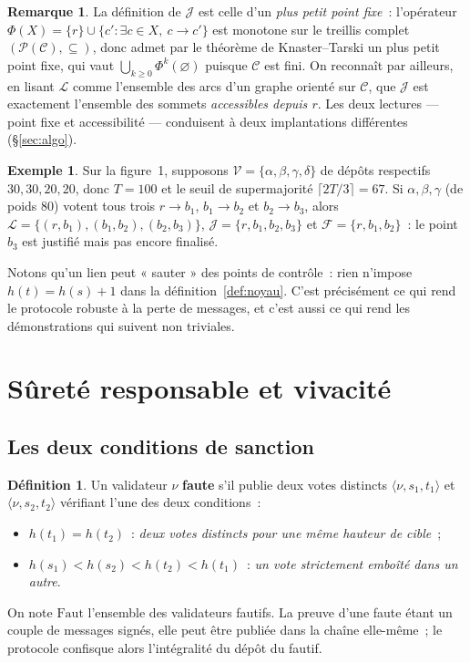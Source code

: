 \documentclass[11pt,a4paper]{article}
\theoremstyle{plain}
\theoremstyle{definition}
\newtheorem{defi}[theoreme]{Définition}
\newtheorem{remarque}[theoreme]{Remarque}
\newtheorem{exemple}[theoreme]{Exemple}
\newcommand{\Cc}{\mathcal{C}}
\newcommand{\Vv}{\mathcal{V}}
\newcommand{\Ll}{\mathcal{L}}
\newcommand{\Jj}{\mathcal{J}}
\newcommand{\Ff}{\mathcal{F}}
\begin{document}
\begin{remarque}
La définition de $\Jj$ est celle d'un \emph{plus petit point fixe}~: l'opérateur
$\Phi(X)=\{r\}\cup\{c' : \exists c\in X,\ c\to c'\}$ est monotone sur le treillis complet
$(\mathcal{P}(\Cc),\subseteq)$, donc admet par le théorème de Knaster--Tarski un plus petit
point fixe, qui vaut $\bigcup_{k\ge 0}\Phi^k(\varnothing)$ puisque $\Cc$ est fini. On
reconnaît par ailleurs, en lisant $\Ll$ comme l'ensemble des arcs d'un graphe orienté sur
$\Cc$, que $\Jj$ est exactement l'ensemble des sommets \emph{accessibles depuis $r$}. Les
deux lectures — point fixe et accessibilité — conduisent à deux implantations différentes
(§\ref{sec:algo}).
\end{remarque}

\begin{exemple}
Sur la figure~1, supposons $\Vv=\{\alpha,\beta,\gamma,\delta\}$ de dépôts respectifs
$30,30,20,20$, donc $T=100$ et le seuil de supermajorité $\lceil 2T/3\rceil = 67$. Si
$\alpha,\beta,\gamma$ (de poids $80$) votent tous trois $r\to b_1$, $b_1\to b_2$ et
$b_2\to b_3$, alors $\Ll=\{(r,b_1),(b_1,b_2),(b_2,b_3)\}$, $\Jj=\{r,b_1,b_2,b_3\}$ et
$\Ff=\{r,b_1,b_2\}$~: le point $b_3$ est justifié mais pas encore finalisé.
\end{exemple}

Notons qu'un lien peut « sauter » des points de contrôle~: rien n'impose $h(t)=h(s)+1$ dans
la définition~\ref{def:noyau}. C'est précisément ce qui rend le protocole robuste à la perte
de messages, et c'est aussi ce qui rend les démonstrations qui suivent non triviales.

\section{Sûreté responsable et vivacité}\label{sec:surete}

\subsection{Les deux conditions de sanction}

\begin{defi}\label{def:comm}
Un validateur $\nu$ \textbf{faute} s'il publie deux votes distincts $\langle\nu,s_1,t_1
\rangle$ et $\langle\nu,s_2,t_2\rangle$ vérifiant l'une des deux conditions~:
\begin{itemize}[leftmargin=2.4em,itemsep=1pt]
\item[\textbf{(I)}] $h(t_1)=h(t_2)$~: \emph{deux votes distincts pour une même hauteur de
cible}~;
\item[\textbf{(II)}] $h(s_1)<h(s_2)<h(t_2)<h(t_1)$~: \emph{un vote strictement emboîté dans
un autre}.
\end{itemize}
On note $\mathrm{Faut}$ l'ensemble des validateurs fautifs. La preuve d'une faute étant un couple
de messages signés, elle peut être publiée dans la chaîne elle-même~; le protocole confisque
alors l'intégralité du dépôt du fautif.
\end{defi}
\end{document}
